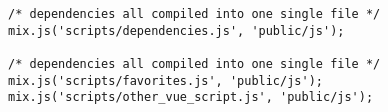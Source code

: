 
\begin{lstlisting}[style=htmlcssjs]
/* dependencies all compiled into one single file */
mix.js('scripts/dependencies.js', 'public/js');

/* dependencies all compiled into one single file */
mix.js('scripts/favorites.js', 'public/js');
mix.js('scripts/other_vue_script.js', 'public/js');
\end{lstlisting}
